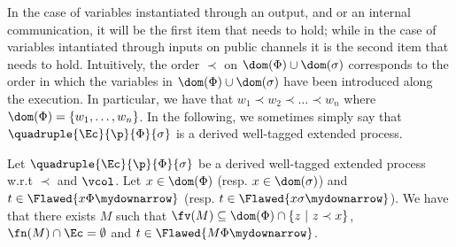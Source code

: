 {In the case of variables instantiated through an output, and or an internal communication, it will be the first item that needs to hold; while in the case of variables intantiated through inputs on public channels it is the second item that needs to hold.} Intuitively, the order $\prec$ on $\dom(\Phi) \cup \dom(\sigma)$ corresponds to the order in which the variables in $\dom(\Phi) \cup \dom(\sigma)$ have been introduced along the execution. In particular, we have that $w_1 \prec w_2 \prec \ldots \prec w_n$ where $\dom(\Phi) = \{w_1,\ldots, w_n\}$. In the following, we sometimes simply say that $\quadruple{\Ec}{\p}{\Phi}{\sigma}$ is a derived well-tagged extended process.







\begin{lemma}
  \label{lem:Flawedandframeelement}
  Let $\quadruple{\Ec}{\p}{\Phi}{\sigma}$ be a derived well-tagged extended process w.r.t $\prec$ and $\vcol$. Let $x \in \dom(\Phi)$ (resp. $x \in \dom(\sigma)$) and $t \in   \Flawed{x\Phi\mydownarrow}$ (resp. $t \in \Flawed{x\sigma\mydownarrow}$). We have that there exists $M$ such that $\fv(M) \subseteq \dom(\Phi) \cap \{z ~|~ z \prec x\}$, $\fn(M) \cap \Ec = \emptyset$ and $t \in \Flawed{M\Phi\mydownarrow}$.
\end{lemma}

